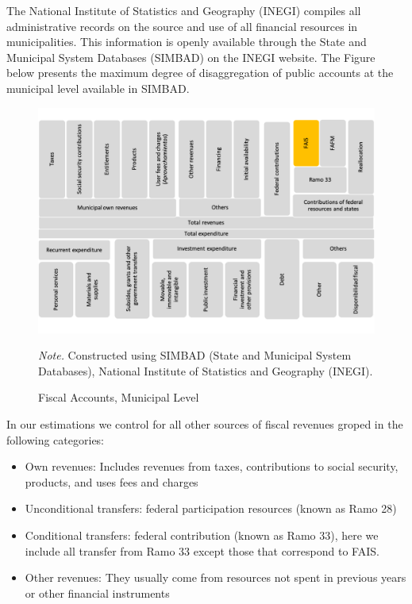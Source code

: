 \documentclass[dv_diss_main.tex]{subfiles}
\begin{document}
 \label{Ap:fiscalcategories}

The National Institute of Statistics and Geography (INEGI) compiles all administrative records on the source and use of all financial resources in municipalities. This information is openly available through the State and Municipal System Databases (SIMBAD) on the INEGI website. The Figure below presents the maximum degree of disaggregation of public accounts at the municipal level available in SIMBAD. 
\begin{figure}[H] 
	\centering 
	
		\centering
		\includegraphics[width=0.8\linewidth]{figures/FAIS_in_local_finances.png}
		\caption{Fiscal Accounts, Municipal Level}\label{fig:discon}
	\vspace{0.1cm}
\parbox{\textwidth}{\small 
	\footnotesize	
	\textit{Note. }Constructed using SIMBAD (State and Municipal System Databases), National Institute of Statistics and Geography (INEGI).
	}
\end{figure}

\newpage

In our estimations we control for all other sources of fiscal revenues groped in the following categories:

\begin{itemize}
    \item Own revenues: Includes revenues from taxes, contributions to social security, products, and uses fees and charges
    \item Unconditional transfers: federal participation resources (known as Ramo 28)
    \item Conditional transfers: federal contribution (known as Ramo 33), here we include all transfer from Ramo 33 except those that correspond to FAIS.
    \item Other revenues: They usually come from resources not spent in previous years or other financial instruments
\end{itemize}
\end{document}
